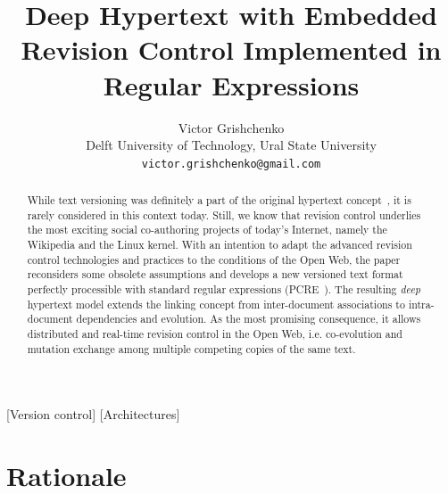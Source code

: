 \documentclass{sig-alternate}
\date{}
\begin{document}
\title{Deep Hypertext with Embedded Revision Control Implemented in Regular Expressions}

\author{Victor Grishchenko \\ \small Delft University of Technology, Ural State University \\ {\tt victor.grishchenko@gmail.com} }

\maketitle

\begin{abstract}
While text versioning was definitely a part of the original
hypertext concept~\cite{nls,literary,hyp-ed-sys},
it is rarely considered in this context today.
Still, we know that revision control underlies the most exciting
social co-authoring projects of today's Internet, namely the
Wikipedia and the Linux kernel. With an intention to adapt the
advanced revision control technologies and practices to the
conditions of the Open Web, the paper reconsiders some obsolete
assumptions and develops a new versioned text format perfectly
processible with standard regular expressions (PCRE~\cite{pcre}).
The resulting \emph{deep} hypertext model extends the linking
concept from inter-document associations to intra-document
dependencies and evolution. As the most promising consequence,
it allows distributed and real-time revision control in the Open
Web, i.e. co-evolution and mutation exchange among multiple
competing copies of the same text. 

\end{abstract}

[Version control]
[Architectures]

\section{Rationale}
\end{document}
